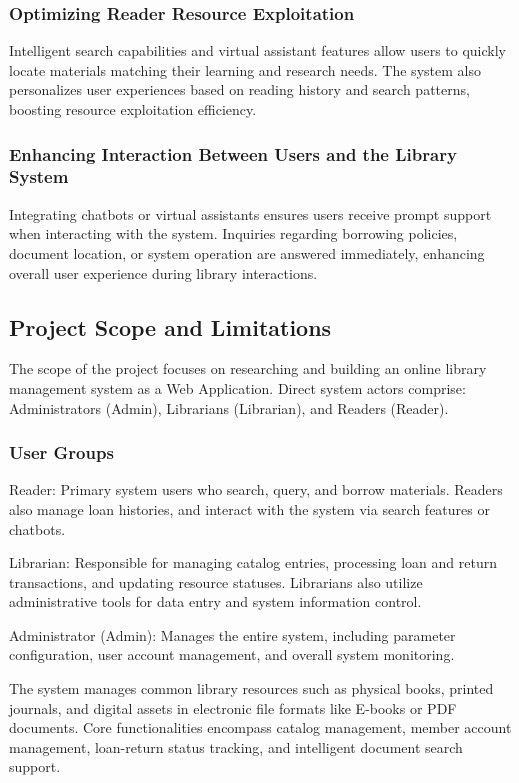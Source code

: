 \subsubsection{Optimizing Reader Resource Exploitation}

Intelligent search capabilities and virtual assistant features allow users to quickly locate materials matching their learning and research needs. The system also personalizes user experiences based on reading history and search patterns, boosting resource exploitation efficiency.

\subsubsection{Enhancing Interaction Between Users and the Library System}

Integrating chatbots or virtual assistants ensures users receive prompt support when interacting with the system. Inquiries regarding borrowing policies, document location, or system operation are answered immediately, enhancing overall user experience during library interactions.

\subsection{Project Scope and Limitations}

The scope of the project focuses on researching and building an online library management system as a Web Application. Direct system actors comprise: Administrators (Admin), Librarians (Librarian), and Readers (Reader).

\subsubsection{User Groups}

Reader: Primary system users who search, query, and borrow materials. Readers also manage loan histories, and interact with the system via search features or chatbots.

Librarian: Responsible for managing catalog entries, processing loan and return transactions, and updating resource statuses. Librarians also utilize administrative tools for data entry and system information control.

Administrator (Admin): Manages the entire system, including parameter configuration, user account management, and overall system monitoring.

The system manages common library resources such as physical books, printed journals, and digital assets in electronic file formats like E-books or PDF documents. Core functionalities encompass catalog management, member account management, loan-return status tracking, and intelligent document search support.

